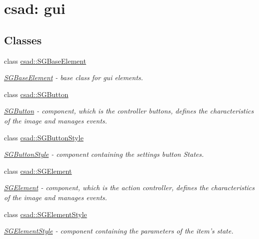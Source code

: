 \hypertarget{group__scenegui}{\section{csad\-: gui}
\label{group__scenegui}
}
\subsection*{Classes}
\begin{DoxyCompactItemize}
\item 
class \hyperlink{classcsad_1_1_s_g_base_element}{csad\-::\-S\-G\-Base\-Element}
\begin{DoxyCompactList}\small\item\em \hyperlink{classcsad_1_1_s_g_base_element}{S\-G\-Base\-Element} -\/ base class for gui elements. \end{DoxyCompactList}\item 
class \hyperlink{classcsad_1_1_s_g_button}{csad\-::\-S\-G\-Button}
\begin{DoxyCompactList}\small\item\em \hyperlink{classcsad_1_1_s_g_button}{S\-G\-Button} -\/ component, which is the controller buttons, defines the characteristics of the image and manages events. \end{DoxyCompactList}\item 
class \hyperlink{classcsad_1_1_s_g_button_style}{csad\-::\-S\-G\-Button\-Style}
\begin{DoxyCompactList}\small\item\em \hyperlink{classcsad_1_1_s_g_button_style}{S\-G\-Button\-Style} -\/ component containing the settings button States. \end{DoxyCompactList}\item 
class \hyperlink{classcsad_1_1_s_g_element}{csad\-::\-S\-G\-Element}
\begin{DoxyCompactList}\small\item\em \hyperlink{classcsad_1_1_s_g_element}{S\-G\-Element} -\/ component, which is the action controller, defines the characteristics of the image and manages events. \end{DoxyCompactList}\item 
class \hyperlink{classcsad_1_1_s_g_element_style}{csad\-::\-S\-G\-Element\-Style}
\begin{DoxyCompactList}\small\item\em \hyperlink{classcsad_1_1_s_g_element_style}{S\-G\-Element\-Style} -\/ component containing the parameters of the item's state. \end{DoxyCompactList}\item 

\end{DoxyCompactItemize}
